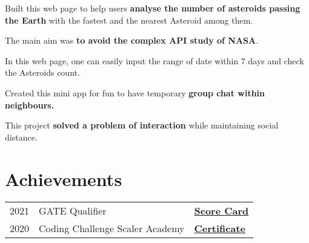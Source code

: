 \documentclass[]{deedy-resume-openfont}
\begin{document}
\begin{minipage}[t]{0.66\textwidth}
\sectionsep

{\href{https://niharika100.github.io/nearEarthObjectStats/}{\bf{}}}
\begin{tightemize}
\item Built this web page to help users \textbf{analyse the number of asteroids passing the Earth }with the fastest and the nearest Asteroid among them.
\item The main aim was \textbf{to avoid the complex API study of NASA}. 
\item In this web page, one can easily input the range of date within 7 days and check the Asteroids count.
\end{tightemize}
\sectionsep

{\href{https://github.com/Niharika100/WebChatApp}{\bf{}}}
\begin{tightemize}
\item Created this mini app for fun to have temporary \textbf{group chat within neighbours.}
\item This project \textbf{solved a problem of interaction} while maintaining social distance.
\end{tightemize}
\sectionsep


\section{Achievements} 
\begin{tabular}{rll}
2021	     & GATE Qualifier  & \bf{\href{https://drive.google.com/file/d/15GE8USUrYsOLWMyxbJCKXGUEODwfVKVF/view?usp=sharing}{Score Card}}\\
2020     & Coding Challenge Scaler Academy &  \bf{\href{https://drive.google.com/file/d/1FvnQb3Byb9vj0uEbBudwzwYHRNe2MFp1/view}{Certificate}} \\
\end{tabular}
\sectionsep

\end{minipage} 
\end{document}
